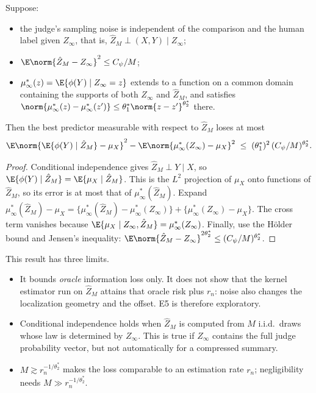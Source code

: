 \begin{proposition}
\label{prop:judge-budget}
Suppose:
\begin{itemize}
  \item the judge's sampling noise is independent of the comparison and the human label given
        $Z_\infty$, that is, $\hat Z_M\perp(X,Y)\mid Z_\infty$;
  \item $\E\norm{\hat Z_M-Z_\infty}^2\le C_\psi/M$;
  \item $\mu_\infty^{*}(z)=\E\{\phi(Y)\mid Z_\infty=z\}$ extends to a function on a common domain
        containing the supports of both $Z_\infty$ and $\hat Z_M$, and satisfies
        $\norm{\mu_\infty^{*}(z)-\mu_\infty^{*}(z')}\le\theta_1^{*}\norm{z-z'}^{\theta_2^{*}}$ there.
\end{itemize}
Then the best predictor measurable with respect to $\hat Z_M$ loses at most
\[
  \E\norm{\E\{\phi(Y)\mid\hat Z_M\}-\mu_X}^2-\E\norm{\mu_\infty^{*}(Z_\infty)-\mu_X}^2
  \;\le\;(\theta_1^{*})^2\,(C_\psi/M)^{\theta_2^{*}} .
\]
\end{proposition}

\begin{proof}
Conditional independence gives $\hat Z_M\perp Y\mid X$, so
$\E\{\phi(Y)\mid\hat Z_M\}=\E\{\mu_X\mid\hat Z_M\}$. This is the $L^2$ projection of $\mu_X$ onto
functions of $\hat Z_M$, so its error is at most that of $\mu_\infty^{*}(\hat Z_M)$. Expand
$\mu_\infty^{*}(\hat Z_M)-\mu_X=\{\mu_\infty^{*}(\hat Z_M)-\mu_\infty^{*}(Z_\infty)\}+\{\mu_\infty^{*}(Z_\infty)-\mu_X\}$.
The cross term vanishes because $\E\{\mu_X\mid Z_\infty,\hat Z_M\}=\mu_\infty^{*}(Z_\infty)$. Finally,
use the H\"older bound and Jensen's inequality:
$\E\norm{\hat Z_M-Z_\infty}^{2\theta_2^{*}}\le(C_\psi/M)^{\theta_2^{*}}$.
\end{proof}

This result has three limits.
\begin{itemize}
  \item It bounds \emph{oracle} information loss only. It does not show that the kernel estimator
        run on $\hat Z_M$ attains that oracle risk plus $r_n$: noise also changes the localization
        geometry and the offset. E5 is therefore exploratory.
  \item Conditional independence holds when $\hat Z_M$ is computed from $M$ i.i.d.\ draws whose law
        is determined by $Z_\infty$. This is true if $Z_\infty$ contains the full judge probability
        vector, but not automatically for a compressed summary.
  \item $M\gtrsim r_n^{-1/\theta_2^{*}}$ makes the loss comparable to an estimation rate $r_n$;
        negligibility needs $M\gg r_n^{-1/\theta_2^{*}}$.
\end{itemize}

